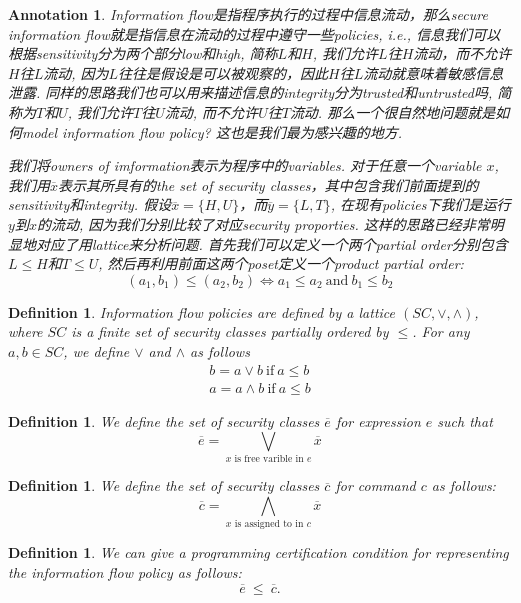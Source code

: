 \documentclass{article}
\newtheorem{definition}[theorem]{Definition}
\newtheorem{annotation}[theorem]{Annotation}
\begin{document}
\begin{annotation}
\rm Information flow是指程序执行的过程中信息流动，那么secure information flow就是指信息在流动的过程中遵守一些policies, i.e., 信息我们可以根据sensitivity分为两个部分low和high, 简称$L$和$H$, 我们允许$L$往$H$流动，而不允许$H$往$L$流动, 因为$L$往往是假设是可以被观察的，因此$H$往$L$流动就意味着敏感信息泄露. 同样的思路我们也可以用来描述信息的integrity分为trusted和untrusted吗, 简称为$T$和$U$, 我们允许$T$往$U$流动, 而不允许$U$往$T$流动. 那么一个很自然地问题就是如何model information flow policy? 这也是我们最为感兴趣的地方. 

我们将owners of imformation表示为程序中的variables. 对于任意一个variable $x$, 我们用$\overline{x}$表示其所具有的the set of security classes，其中包含我们前面提到的sensitivity和integrity. 假设$\overline{x} = \{H,U\}$，而$\overline{y} = \{L, T\}$, 在现有policies下我们是运行$y$到$x$的流动, 因为我们分别比较了对应security proporties. 这样的思路已经非常明显地对应了用lattice来分析问题\cite{DL}. 首先我们可以定义一个两个partial order分别包含$L \leq H$和$T \leq U$, 然后再利用前面这两个poset定义一个product partial order:
\[
	(a_1, b_1) \leq (a_2, b_2) \iff a_1 \leq a_2 ~\text{and}~b_1 \leq b_2 
\]
\end{annotation}

\begin{definition}
\rm Information flow policies are defined by a lattice $(SC, \vee, \wedge)$, where $SC$ is a finite set of security classes partially ordered by $\leq$. For any $a,b \in SC$, we define $\vee$ and $\wedge$ as follows
\[
	\begin{gathered}
	b = a \vee b ~\text{if}~  a \leq b \\
	a = a \wedge b ~\text{if}~  a \leq b	
	\end{gathered}
\]
\end{definition}

\begin{definition}
\rm We define the set of security classes $\overline{e}$ for expression $e$ such that 
\[
\overline{e} = \bigvee\limits_{\text{$x$ is free varible in $e$}} \overline{x}
\]
\end{definition}

\begin{definition}
\rm We define the set of security classes $\overline{c}$ for command $c$ as follows:
\[
	\overline{c} = \bigwedge\limits_{\text{$x$ is assigned to in $c$}} \overline{x}
\]
\end{definition}

\begin{definition}
\rm We can give a programming certification condition for representing the information flow policy as follows:
\[
	\overline{e} ~\leq~ \overline{c}.
\]
\end{definition}
\end{document}
